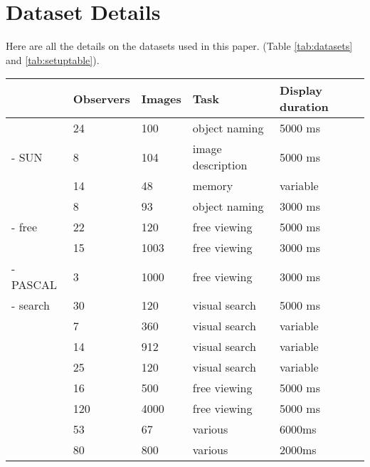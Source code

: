 \section{Dataset Details}

Here are all the details on the datasets used in this paper. (Table \ref{tab:datasets} and \ref{tab:setuptable}).


\begin{table*}
\centering
\small
\begin{tabular}{l|llll}
 						& Observers & Images &  Task & Display duration\\
\hline
\cite{clarke2013}     	& 24   	& 100   & object naming & 5000 ms\\
\cite{yun2013} - SUN    & 8     & 104   & image description & 5000 ms\\
\cite{tatler2005}     	& 14    & 48    & memory 			& variable\\
\cite{einhauser2008} 	& 8		& 93    & object naming 	& 3000 ms \\
\cite{tatler2007} - free & 22   & 120   & free viewing      & 5000 ms\\
\cite{judd2009}         & 15 	& 1003  & free viewing 		& 3000 ms\\
\cite{yun2013} - PASCAL & 3 	& 1000  & free viewing 		& 3000 ms\\
\cite{tatler2007} - search & 30 & 120	& visual search 	& 5000 ms\\
\hline
\cite{clarke2009} 		& 7		& 360	& visual search 	& variable\\
\cite{ehinger2009}     	& 14 	& 912 	& visual search 	& variable\\
\cite{asher2013}    	& 25    & 120   & visual search		& variable\\
\cite{jiang2014}  		& 16 	& 500 	& free viewing  	& 5000 ms \\
\cite{borji2015}  		& 120	& 4000  & free viewing		& 5000 ms\\
\hline
\cite{mills2011} 		& 53	& 67	& various  			& 6000ms\\
\cite{koehler2014}		& 80	& 800	& various			& 2000ms \\
\end{tabular}

\caption{Summary of the 15 datasets used throughout this study. The top eight datasets were used to train the model, while the bottom five were only used for evaluation.}
\label{tab:datasets}
\end{table*}

